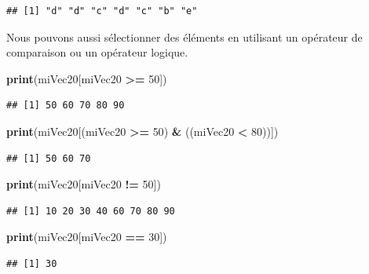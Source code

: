 \documentclass[
]{book}
\newenvironment{Shaded}{\begin{snugshade}}{\end{snugshade}}
\newcommand{\DecValTok}[1]{\textcolor[rgb]{0.00,0.00,0.81}{#1}}
\newcommand{\KeywordTok}[1]{\textcolor[rgb]{0.13,0.29,0.53}{\textbf{#1}}}
\newcommand{\NormalTok}[1]{#1}
\newcommand{\OperatorTok}[1]{\textcolor[rgb]{0.81,0.36,0.00}{\textbf{#1}}}
\newcommand{\StringTok}[1]{\textcolor[rgb]{0.31,0.60,0.02}{#1}}
\begin{document}
\begin{verbatim}
## [1] "d" "d" "c" "d" "c" "b" "e"
\end{verbatim}

Nous pouvons aussi sélectionner des éléments en utilisant un opérateur de comparaison ou un opérateur logique.

\begin{Shaded}
\begin{Highlighting}[]
\KeywordTok{print}\NormalTok{(miVec20[miVec20 }\OperatorTok{>=}\StringTok{ }\DecValTok{50}\NormalTok{])}
\end{Highlighting}
\end{Shaded}

\begin{verbatim}
## [1] 50 60 70 80 90
\end{verbatim}

\begin{Shaded}
\begin{Highlighting}[]
\KeywordTok{print}\NormalTok{(miVec20[(miVec20 }\OperatorTok{>=}\StringTok{ }\DecValTok{50}\NormalTok{) }\OperatorTok{&}\StringTok{ }\NormalTok{((miVec20 }\OperatorTok{<}\StringTok{ }\DecValTok{80}\NormalTok{))])}
\end{Highlighting}
\end{Shaded}

\begin{verbatim}
## [1] 50 60 70
\end{verbatim}

\begin{Shaded}
\begin{Highlighting}[]
\KeywordTok{print}\NormalTok{(miVec20[miVec20 }\OperatorTok{!=}\StringTok{ }\DecValTok{50}\NormalTok{])}
\end{Highlighting}
\end{Shaded}

\begin{verbatim}
## [1] 10 20 30 40 60 70 80 90
\end{verbatim}

\begin{Shaded}
\begin{Highlighting}[]
\KeywordTok{print}\NormalTok{(miVec20[miVec20 }\OperatorTok{==}\StringTok{ }\DecValTok{30}\NormalTok{])}
\end{Highlighting}
\end{Shaded}

\begin{verbatim}
## [1] 30
\end{verbatim}
\end{document}
